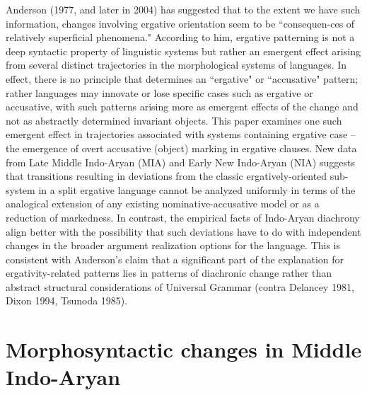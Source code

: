\documentclass[output=paper,
modfonts
]{LSP/langsci}
\begin{document}
Anderson (1977, and later in 2004) 
has suggested  that to the extent we have such information,  changes involving ergative orientation seem to be ``consequen-ces of relatively superficial phenomena."   According to him, ergative patterning is not a deep syntactic property of linguistic systems  but rather an emergent effect arising  from several distinct trajectories in the morphological systems  of languages. In effect, there is no principle that determines  an ``ergative" or ``accusative" pattern; rather languages may innovate or lose specific cases such as ergative or accusative, with such patterns arising more as emergent effects of the change and not   as abstractly determined invariant objects. 
This paper examines one such emergent effect in trajectories associated with systems containing ergative case  -- the emergence of overt accusative (object) marking in ergative clauses. New  data from Late Middle Indo-Aryan (MIA)  and Early New Indo-Aryan (NIA) suggests that transitions resulting in deviations from the classic ergatively-oriented sub-system in a split ergative language cannot be analyzed uniformly in terms of  the analogical extension of  any existing  nominative-accusative model or as a reduction of markedness.  In contrast,  the empirical facts of Indo-Aryan diachrony align better with  the possibility that such deviations have to do with independent changes in the broader argument realization options for the language. 
This is consistent with  Anderson's claim that a significant part of the explanation for ergativity-related patterns lies in  patterns of diachronic change rather than abstract structural considerations  of Universal Grammar (contra Delancey 1981, Dixon 1994, Tsunoda 1985). 

\section{Morphosyntactic changes in Middle  Indo-Aryan } 
\end{document}

